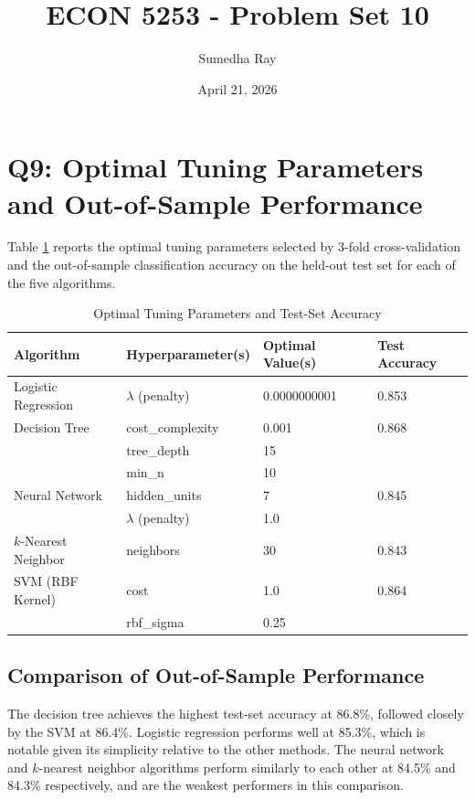 \documentclass{article}
\title{ECON 5253 - Problem Set 10}
\author{Sumedha Ray}
\date{April 21, 2026}
\begin{document}
\maketitle

\section*{Q9: Optimal Tuning Parameters and Out-of-Sample Performance}

Table \ref{tab:results} reports the optimal tuning parameters selected by 3-fold cross-validation and the out-of-sample classification accuracy on the held-out test set for each of the five algorithms.

\begin{table}[h!]
\centering
\caption{Optimal Tuning Parameters and Test-Set Accuracy}
\label{tab:results}
\begin{tabular}{llll}
\toprule
Algorithm & Hyperparameter(s) & Optimal Value(s) & Test Accuracy \\
\midrule
Logistic Regression & $\lambda$ (penalty) & 0.0000000001 & 0.853 \\
Decision Tree & cost\_complexity & 0.001 & 0.868 \\
                   & tree\_depth & 15 & \\
                   & min\_n & 10 & \\
Neural Network & hidden\_units & 7 & 0.845 \\
               & $\lambda$ (penalty) & 1.0 & \\
$k$-Nearest Neighbor & neighbors & 30 & 0.843 \\
SVM (RBF Kernel) & cost & 1.0 & 0.864 \\
                 & rbf\_sigma & 0.25 & \\
\bottomrule
\end{tabular}
\end{table}

\subsection*{Comparison of Out-of-Sample Performance}

The decision tree achieves the highest test-set accuracy at 86.8\%, followed closely by the SVM at 86.4\%. Logistic regression performs well at 85.3\%, which is notable given its simplicity relative to the other methods. The neural network and $k$-nearest neighbor algorithms perform similarly to each other at 84.5\% and 84.3\% respectively, and are the weakest performers in this comparison.
\end{document}
